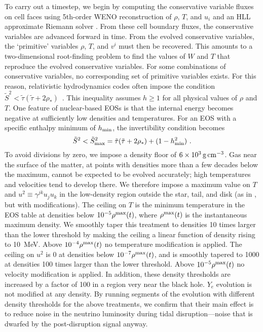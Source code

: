 To carry out a timestep, we begin by computing the conservative variable
fluxes on cell faces using 5th-order WENO reconstruction \citep{Liu1994200,
Jiang1996202} of $\rho$, $T$, and $u_i$ and an HLL approximate Riemann solver
\citep{HLL}.  From these
cell boundary fluxes, the conservative variables are advanced forward in time. 
From the evolved conservative variables, the `primitive' variables $\rho$,
$T$, and $v^i$ must then be recovered.  This amounts to a two-dimensional
root-finding problem to find the values of $W$ and $T$ that reproduce the
evolved conservative variables.  For some combinations of conservative
variables, no corresponding set of primitive variables exists.  For this
reason, relativistic
hydrodynamics codes often impose the condition 
$\tilde S^2 < \tilde\tau (\tilde\tau + 2\rho_*)$~\citep{Etienne:2007jg}.
This inequality assumes $h\ge 1$ for all physical values of $\rho$ and $T$. 
One feature of nuclear-based EOSs is that the internal energy becomes
negative at sufficiently low densities and temperatures.  For an EOS
with a specific enthalpy minimum of $h_{\rm min}$, the invertibility condition
becomes
\begin{equation}
\tilde S^2 < \tilde S^2_{\rm max} = \tilde\tau (\tilde\tau + 2\rho_*)
+ (1-h^2_{\rm min})\ .
\end{equation}
To avoid divisions by zero, we impose a density floor of
$6 \times 10^3\rm\,g\,cm^{-3}$.
Gas near the surface of the matter, at points
with densities more than a few decades below the maximum, cannot
be expected to be evolved accurately; high temperatures and velocities tend
to develop there. We therefore impose a maximum value on
$T$ and $u^2 \equiv \gamma^{jk} u_j u_k$ in the low-density region outside the
star, tail, and disk (as in \citealt{Foucart:2013a}, but with modifications).
The ceiling on $T$ is the minimum temperature in the EOS table at densities below
$10^{-5}\rho^{\rm max}(t)$, where $\rho^{\rm max}(t)$ is the instantaneous maximum
density. We smoothly taper this treatment to densities 10 times larger than the lower
threshold by making the ceiling a linear function of density rising to 10~MeV.
Above $10^{-4}\rho^{\rm max}(t)$ no temperature modification is applied.
The ceiling on $u^2$ is 0 at densities below $10^{-7}\rho^{\rm max}(t)$,
and is smoothly tapered to 1000 at densities 100 times larger than the lower threshold.
Above $10^{-5}\rho^{\rm max}(t)$ no velocity modification is applied.
In addition, these density thresholds are increased by a factor of 100 in a region
very near the black hole. $Y_e$ evolution is not modified at any density.
By running segments of the evolution with different density
thresholds for the above treatments, we confirm that their main effect
is to reduce noise in the neutrino luminosity during tidal
disruption---noise that is dwarfed by the post-disruption signal anyway.

